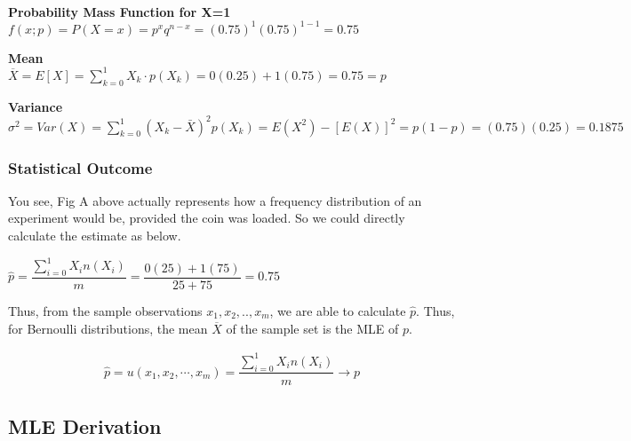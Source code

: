 \documentclass[float=false,crop=false]{standalone}
\begin{document}
    \begin{center}
    \end{center}
    { \hspace*{\fill} \\}
    
    \textbf{Probability Mass Function for X=1}\\
\(f(x;p) = P(X = x) = p^{x}q^{n-x} = (0.75)^{1}(0.75)^{1-1} = 0.75\)

\textbf{Mean}\\
\(\overline{X} = E[X] = \sum\limits_{k=0}^1X_k \cdot p(X_k) = 0(0.25) + 1(0.75) = 0.75 = p\)

\textbf{Variance}\\
\(\sigma^2 = Var(X) = \sum\limits_{k=0}^1 (X_{k}-\bar{X})^2p(X_k) = E(X^2) - [E(X)]^2 = p(1-p) = (0.75)(0.25) = 0.1875\)

    \subsubsection{Statistical Outcome}\label{statistical-outcome}

You see, Fig A above actually represents how a frequency distribution of
an experiment would be, provided the coin was loaded. So we could
directly calculate the estimate as below.

\(\hat{p} = \dfrac{\sum\limits_{i=0}^1X_in(X_i)}{m} = \dfrac{0(25) + 1(75)}{25 + 75} = 0.75\)

Thus, from the sample observations \(x_1, x_2,.. ,x_m\), we are able to
calculate \(\hat{p}\). Thus, for Bernoulli distributions, the mean
\(\overline{X}\) of the sample set is the MLE of \(p\).
\begin{tcolorbox}[colback=green!5,colframe=green!40!black,title=Bernoulli Distribution; $m$ trials]
\begin{equation}
    \begin{aligned}
        \hat{p} = u(x_1,x_2,\cdots,x_m) = \dfrac{\sum\limits_{i=0}^1X_in(X_i)}{m} \to p \label{eq:M001}
    \end{aligned}
\end{equation}
\end{tcolorbox}
    \subsection{MLE Derivation}\label{mle-derivation}
\end{document}
